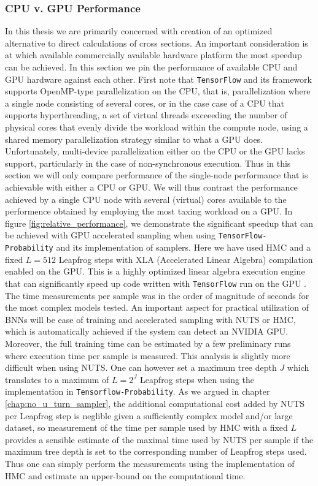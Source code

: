\subsubsection{CPU v. GPU Performance}
In this thesis we are primarily concerned with creation of an optimized alternative to direct calculations of cross sections.
An important consideration is at which available commercially available hardware platform the most speedup can be achieved. In this section
we pin the performance of available CPU and GPU hardware against each other. First note that {\tt TensorFlow} and its framework supports OpenMP-type parallelization on the CPU, that is, parallelization where a single node consisting of several cores, or in the case case of a CPU that supports hyperthreading, a set of virtual threads exceeeding the number of physical cores that evenly divide the workload within the compute node, using a shared memory parallelization strategy similar to what a GPU does. Unfortunately, multi-device parallelization either on the CPU or the GPU lacks support, particularly in the case of non-synchronous execution. Thus in this section we will only compare performance of the single-node performance that is achievable with either a CPU or GPU. We will thus contrast the performance achieved by a single CPU node with several (virtual) cores available to the performence obtained by employing the most taxing workload on a GPU.
In figure \ref{fig:relative_performance}, we demonstrate the significant speedup that can be achieved
with GPU accelerated sampling when using {\tt TensorFlow-Probability} and its implementation of samplers. Here we have used HMC and a fixed $L = 512$ Leapfrog steps with XLA (Accelerated Linear Algebra) compilation enabled on the GPU. This is a highly optimized linear algebra execution engine that can significantly speed up code written with {\tt TensorFlow} run on the GPU \cite{xla}. The time measurements per sample was in the order of magnitude of seconds for the most complex models
tested. An important aspect for practical utilization of BNNs will be ease of training and accelerated sampling with NUTS or HMC, which is automatically achieved if the system can detect an NVIDIA GPU. Moreover, the full training time can be estimated by a few preliminary runs where execution time per sample is measured. This analysis is slightly more difficult when using NUTS. One can however set a maximum tree depth $J$ which translates to a maximum of $L = 2^J$ Leapfrog steps when using the implementation in {\tt Tensorflow-Probability}. As we argued in chapter \ref{chap:no_u_turn_sampler}, the additional computational cost added by NUTS per Leapfrog step is neglible given a sufficiently complex model and/or large dataset, so measurement of the time per sample used by HMC with a fixed $L$ provides a sensible estimate of the maximal time used by NUTS per sample if the maximum tree depth is set to the corresponding number of Leapfrog steps used.
Thus one can simply perform the measurements using the implementation of HMC and estimate an upper-bound on the computational time.

